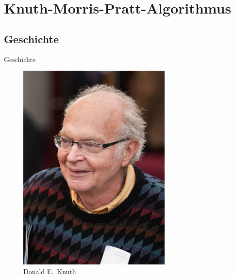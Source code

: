 \documentclass[xcolor=dvipsnames, aspectratio=1610]{beamer}
\begin{document}
\section{Knuth-Morris-Pratt-Algorithmus}

\subsection{Geschichte}

\begin{frame}{Geschichte}
\begin{minipage}{0.3\textwidth}
\begin{figure}
\includegraphics[width=.8\textwidth]{knuth}
\caption{Donald E.\ Knuth}
\end{figure}
\end{minipage}
\hfill
\begin{minipage}{0.3\textwidth}
\begin{figure}

\end{figure}
\end{minipage}
\end{frame}
\end{document}
